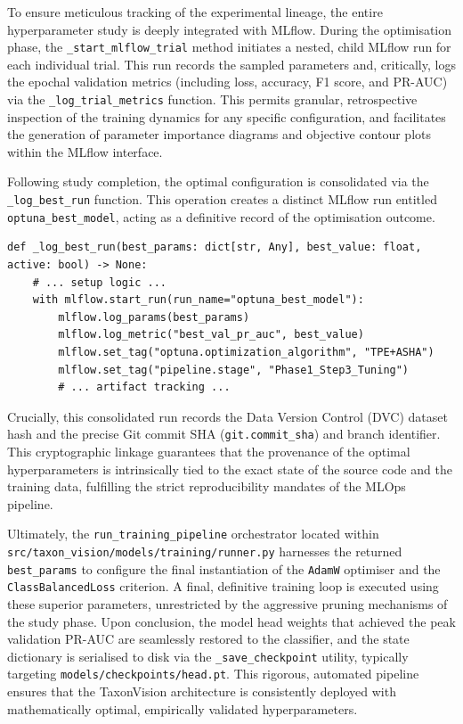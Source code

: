 To ensure meticulous tracking of the experimental lineage, the entire hyperparameter study is deeply integrated with MLflow. During the optimisation phase, the \texttt{\_start\_mlflow\_trial} method initiates a nested, child MLflow run for each individual trial. This run records the sampled parameters and, critically, logs the epochal validation metrics (including loss, accuracy, F1 score, and PR-AUC) via the \texttt{\_log\_trial\_metrics} function. This permits granular, retrospective inspection of the training dynamics for any specific configuration, and facilitates the generation of parameter importance diagrams and objective contour plots within the MLflow interface.

Following study completion, the optimal configuration is consolidated via the \texttt{\_log\_best\_run} function. This operation creates a distinct MLflow run entitled \texttt{optuna\_best\_model}, acting as a definitive record of the optimisation outcome.
\begin{listing}[htbp]
\begin{verbatim}
def _log_best_run(best_params: dict[str, Any], best_value: float, active: bool) -> None:
    # ... setup logic ...
    with mlflow.start_run(run_name="optuna_best_model"):
        mlflow.log_params(best_params)
        mlflow.log_metric("best_val_pr_auc", best_value)
        mlflow.set_tag("optuna.optimization_algorithm", "TPE+ASHA")
        mlflow.set_tag("pipeline.stage", "Phase1_Step3_Tuning")
        # ... artifact tracking ...
\end{verbatim}
\caption{Consolidation of the optimal trial configuration in MLflow.}
\label{lst:log_best_run}
\end{listing}

Crucially, this consolidated run records the Data Version Control (DVC) dataset hash and the precise Git commit SHA (\texttt{git.commit\_sha}) and branch identifier. This cryptographic linkage guarantees that the provenance of the optimal hyperparameters is intrinsically tied to the exact state of the source code and the training data, fulfilling the strict reproducibility mandates of the MLOps pipeline.

Ultimately, the \texttt{run\_training\_pipeline} orchestrator located within\\\texttt{src/taxon\_vision/models/training/runner.py} harnesses the returned \texttt{best\_params} to configure the final instantiation of the \texttt{AdamW} optimiser and the \texttt{ClassBalancedLoss} criterion. A final, definitive training loop is executed using these superior parameters, unrestricted by the aggressive pruning mechanisms of the study phase. Upon conclusion, the model head weights that achieved the peak validation PR-AUC are seamlessly restored to the classifier, and the state dictionary is serialised to disk via the \texttt{\_save\_checkpoint} utility, typically targeting \texttt{models/checkpoints/head.pt}. This rigorous, automated pipeline ensures that the TaxonVision architecture is consistently deployed with mathematically optimal, empirically validated hyperparameters.
